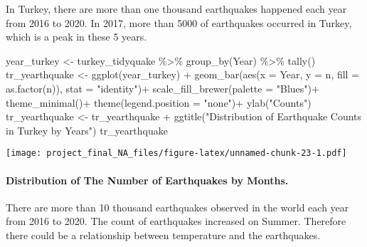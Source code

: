 \documentclass[
]{article}
\newenvironment{Shaded}{\begin{snugshade}}{\end{snugshade}}
\newcommand{\AttributeTok}[1]{\textcolor[rgb]{0.77,0.63,0.00}{#1}}
\newcommand{\FunctionTok}[1]{\textcolor[rgb]{0.00,0.00,0.00}{#1}}
\newcommand{\NormalTok}[1]{#1}
\newcommand{\OtherTok}[1]{\textcolor[rgb]{0.56,0.35,0.01}{#1}}
\newcommand{\SpecialCharTok}[1]{\textcolor[rgb]{0.00,0.00,0.00}{#1}}
\newcommand{\StringTok}[1]{\textcolor[rgb]{0.31,0.60,0.02}{#1}}
\begin{document}
In Turkey, there are more than one thousand earthquakes happened each
year from 2016 to 2020. In 2017, more than 5000 of earthquakes occurred
in Turkey, which is a peak in these 5 years.

\begin{Shaded}
\begin{Highlighting}[]
\NormalTok{year\_turkey }\OtherTok{\textless{}{-}}\NormalTok{ turkey\_tidyquake }\SpecialCharTok{\%\textgreater{}\%}
                \FunctionTok{group\_by}\NormalTok{(Year) }\SpecialCharTok{\%\textgreater{}\%} 
                \FunctionTok{tally}\NormalTok{()}
\NormalTok{tr\_yearthquake }\OtherTok{\textless{}{-}} \FunctionTok{ggplot}\NormalTok{(year\_turkey) }\SpecialCharTok{+} \FunctionTok{geom\_bar}\NormalTok{(}\FunctionTok{aes}\NormalTok{(}\AttributeTok{x =}\NormalTok{ Year, }\AttributeTok{y =}\NormalTok{ n, }\AttributeTok{fill =} \FunctionTok{as.factor}\NormalTok{(n)),}
                                                 \AttributeTok{stat =} \StringTok{"identity"}\NormalTok{)}\SpecialCharTok{+}
                  \FunctionTok{scale\_fill\_brewer}\NormalTok{(}\AttributeTok{palette =} \StringTok{"Blues"}\NormalTok{)}\SpecialCharTok{+}
                  \FunctionTok{theme\_minimal}\NormalTok{()}\SpecialCharTok{+}
                  \FunctionTok{theme}\NormalTok{(}\AttributeTok{legend.position =} \StringTok{"none"}\NormalTok{)}\SpecialCharTok{+}
                  \FunctionTok{ylab}\NormalTok{(}\StringTok{"Counts"}\NormalTok{)}
\NormalTok{tr\_yearthquake }\OtherTok{\textless{}{-}}\NormalTok{ tr\_yearthquake }\SpecialCharTok{+} \FunctionTok{ggtitle}\NormalTok{(}\StringTok{"Distribution of Earthquake Counts in Turkey by Years"}\NormalTok{)}
\NormalTok{tr\_yearthquake}
\end{Highlighting}
\end{Shaded}

\texttt{[image: project\_final\_NA\_files/figure-latex/unnamed-chunk-23-1.pdf]}

\hypertarget{distribution-of-the-number-of-earthquakes-by-months.}{%
\paragraph{Distribution of The Number of Earthquakes by
Months.}\label{distribution-of-the-number-of-earthquakes-by-months.}}

There are more than 10 thousand earthquakes observed in the world each
year from 2016 to 2020. The count of earthquakes increased on Summer.
Therefore there could be a relationship between temperature and the
earthquakes.
\end{document}

